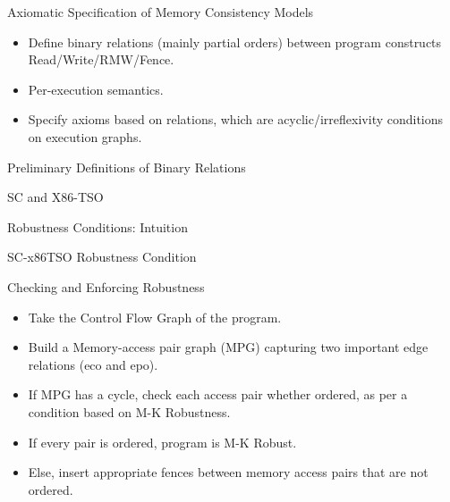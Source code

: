 \documentclass[notes, xcolor=dvipsnames]{beamer}
\begin{document}
    \begin{frame}{Axiomatic Specification of Memory Consistency Models}

        \begin{itemize}
            \item Define binary relations (mainly partial orders) between program constructs Read/Write/RMW/Fence. 
            \item Per-execution semantics. 
            \item Specify axioms based on relations, which are acyclic/irreflexivity conditions on execution graphs. 
        \end{itemize}

    \end{frame}

    \begin{frame}{Preliminary Definitions of Binary Relations}


    \end{frame}

    \begin{frame}{SC and X86-TSO}



    \end{frame}

    \begin{frame}{Robustness Conditions: Intuition}


    \end{frame}

    \begin{frame}{SC-x86TSO Robustness Condition}


    \end{frame}

    \begin{frame}{Checking and Enforcing Robustness}

        \begin{itemize}
            \item Take the Control Flow Graph of the program.
            \item Build a Memory-access pair graph (MPG) capturing two important edge relations (eco and epo).
            \item If MPG has a cycle, check each access pair whether ordered, as per a condition based on M-K Robustness.
            \item If every pair is ordered, program is M-K Robust.
            \item Else, insert appropriate fences between memory access pairs that are not ordered. 
        \end{itemize}

    \end{frame}
\end{document}
